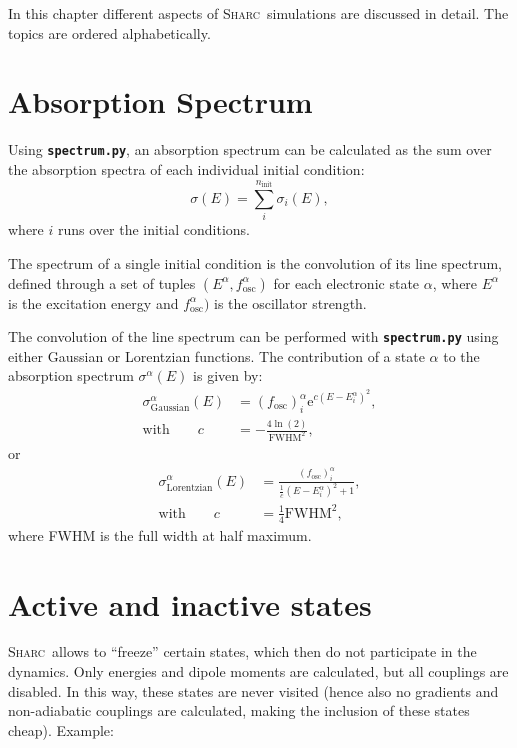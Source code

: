 \documentclass[a4paper,11pt,DIV=15,openany,twoside=false]{scrbook}
\newcommand{\sharc}{\textsc{Sharc}}
\newcommand{\ttt}[1]{\textbf{\texttt{#1}}}
\newcommand{\E}{\ensuremath{\mathrm{e}}}
\begin{document}
In this chapter different aspects of \sharc\ simulations are discussed in detail. The topics are ordered alphabetically.


\section{Absorption Spectrum}\label{met:spectrum}

Using \ttt{spectrum.py}, an absorption spectrum can be calculated as the sum over the absorption spectra of each individual initial condition:
\begin{equation}
  \sigma(E)=\sum\limits_i^{n_\text{init}} \sigma_i(E),
\end{equation}
where $i$ runs over the initial conditions.

The spectrum of a single initial condition is the convolution of its line spectrum, defined through a set of tuples $(E^\alpha,f_\text{osc}^\alpha)$ for each electronic state $\alpha$, where $E^\alpha$ is the excitation energy and $f_\text{osc}^\alpha)$ is the oscillator strength.

The convolution of the line spectrum can be performed with \ttt{spectrum.py} using either Gaussian or Lorentzian functions. The contribution of a state $\alpha$ to the absorption spectrum $\sigma^\alpha(E)$ is given by:
\begin{align}
  \sigma_{\text{Gaussian}}^\alpha(E)&=
  \left(f_{\text{osc}}\right)_i^\alpha 
  \E^{c\left(E-E_i^\alpha\right)^2},\\
  \text{with}\qquad
  c&=-\frac{4\ln(2)}{\text{FWHM}^2},
\end{align}
or
\begin{align}
  \sigma_{\text{Lorentzian}}^\alpha(E)&=
  \frac{\left(f_{\text{osc}}\right)_i^\alpha}{\frac{1}{c}\left(E-E_i^\alpha\right)^2+1},\\
  \text{with}\qquad
  c&=\frac{1}{4}\text{FWHM}^2,
\end{align}
where FWHM is the full width at half maximum.


\section{Active and inactive states}\label{met:activestates}

\sharc\ allows to ``freeze'' certain states, which then do not participate in the dynamics. Only energies and dipole moments are calculated, but all couplings are disabled. In this way, these states are never visited (hence also no gradients and non-adiabatic couplings are calculated, making the inclusion of these states cheap). Example:
\end{document}
